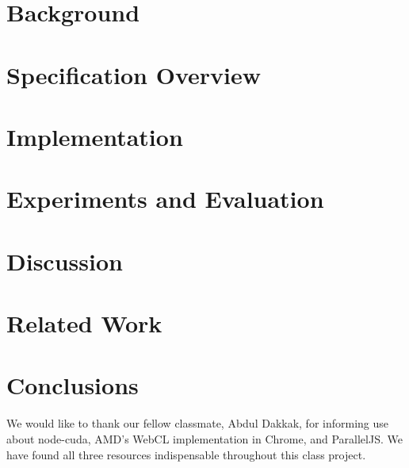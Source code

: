 \documentclass[10pt,reprint]{sigplanconf}
\begin{document}
\section{Background}
\label{background}


\section{Specification Overview}
\label{overview}


\section{Implementation}
\label{imp}


\section{Experiments and Evaluation}
\label{eval}


\section{Discussion}
\label{disc}


\section{Related Work}
\label{related}


\section{Conclusions}
\label{conc}





\acks

We would like to thank our fellow classmate, Abdul Dakkak, for informing use
about node-cuda, AMD's WebCL implementation in Chrome, and ParallelJS.  We have
found all three resources indispensable throughout this class project.






%


\end{document}
